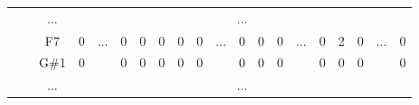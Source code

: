 \documentclass[12pt]{article}
\begin{document}
\begin{table}[H]
{\begin{tabular}{clcccccccccccccccccc}
					   & \multicolumn{1}{l|}{} & \multicolumn{1}{c|}{...}  & \multicolumn{17}{c|}{...}                                                                                                                                                                                                                                                                                                                                                                                                                                                                                                                       \\ \cline{3-4} \cline{6-10} \cline{12-14} \cline{16-18} \cline{20-20} 
					   & \multicolumn{1}{l|}{} & \multicolumn{1}{c|}{F7}   & \multicolumn{1}{c|}{0}    & \multicolumn{1}{c|}{...}                  & \multicolumn{1}{c|}{0}    & \multicolumn{1}{c|}{0}    & \multicolumn{1}{c|}{0}    & \multicolumn{1}{c|}{0}    & \multicolumn{1}{c|}{0}  & \multicolumn{1}{c|}{...}                  & \multicolumn{1}{c|}{0}    & \multicolumn{1}{c|}{0}    & \multicolumn{1}{c|}{0}    & \multicolumn{1}{c|}{...}                  & \multicolumn{1}{c|}{0}  & \multicolumn{1}{c|}{2}  & \multicolumn{1}{c|}{0}  & \multicolumn{1}{c|}{...}                  & \multicolumn{1}{c|}{0}  \\ \cline{3-4} \cline{6-10} \cline{12-14} \cline{16-18} \cline{20-20} 
					   & \multicolumn{1}{l|}{} & \multicolumn{1}{c|}{G\#1} & \multicolumn{1}{c|}{0}    & \multicolumn{1}{c|}{}                     & \multicolumn{1}{c|}{0}    & \multicolumn{1}{c|}{0}    & \multicolumn{1}{c|}{0}    & \multicolumn{1}{c|}{0}    & \multicolumn{1}{c|}{0}  & \multicolumn{1}{c|}{}                     & \multicolumn{1}{c|}{0}    & \multicolumn{1}{c|}{0}    & \multicolumn{1}{c|}{0}    & \multicolumn{1}{c|}{}                     & \multicolumn{1}{c|}{0}  & \multicolumn{1}{c|}{0}  & \multicolumn{1}{c|}{0}  & \multicolumn{1}{c|}{}                     & \multicolumn{1}{c|}{0}  \\ \cline{3-4} \cline{6-10} \cline{12-14} \cline{16-18} \cline{20-20} 
					   & \multicolumn{1}{l|}{} & \multicolumn{1}{c|}{...}  & \multicolumn{17}{c|}{...}                                                                                                                                                                                                                                                                                                                                                                                                                                                                                                                       \\ \cline{3-4} \cline{6-10} \cline{12-14} \cline{16-18} \cline{20-20} 

\end{tabular}}
\end{table}
\end{document}

